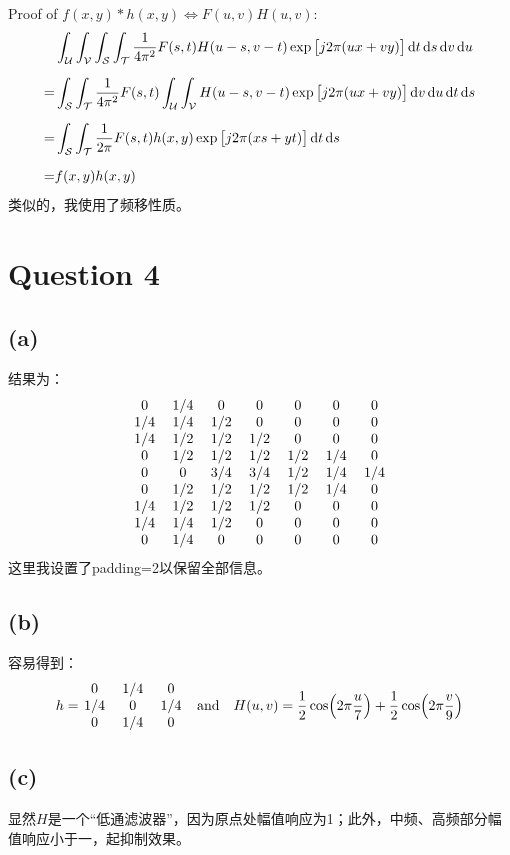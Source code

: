 \documentclass[fontset=macnew]{article}
\begin{document}
Proof of $f(x,y)*h(x,y)\iff F(u,v)H(u,v)$:
\[
	\begin{aligned}
		&\int_{\mathcal{U}}\int_{\mathcal{V}}\int_{\mathcal{S}}\int_{\mathcal{T}}
		\frac{1}{4\pi^2}
		F(s,t)H(u-s,v-t)\exp\big[j2\pi(ux+vy)\big]
		\dd{t}\dd{s}\dd{v}\dd{u}
		\\[6pt]=&
		\int_{\mathcal{S}}\int_{\mathcal{T}}
		\frac{1}{4\pi^2}
		F(s,t)
		\int_{\mathcal{U}}\int_{\mathcal{V}}
		H(u-s,v-t)\exp\big[j2\pi(ux+vy)\big]
		\dd{v}\dd{u}\dd{t}\dd{s}
		\\[6pt]=&
		\int_{\mathcal{S}}\int_{\mathcal{T}}
		\frac{1}{2\pi}
		F(s,t)h(x,y)\exp\big[j2\pi(xs+yt)\big]
		\dd{t}\dd{s}
		\\[6pt]=&
		f(x,y)h(x,y)
	\end{aligned}
\]类似的，我使用了频移性质。

\section*{Question 4}
\subsection*{(a)}
结果为：
\[
	\mqty{
	0 & \flatfrac{1}{4} & 0 & 0 & 0 & 0 & 0 \\
	\flatfrac{1}{4} & \flatfrac{1}{4} & \flatfrac{1}{2} & 0 & 0 & 0 & 0 \\
	\flatfrac{1}{4} & \flatfrac{1}{2} & \flatfrac{1}{2} & \flatfrac{1}{2} & 0 & 0 & 0 \\
	0 & \flatfrac{1}{2} & \flatfrac{1}{2} & \flatfrac{1}{2} & \flatfrac{1}{2} & \flatfrac{1}{4} & 0 \\
	0 & 0 & \flatfrac{3}{4} & \flatfrac{3}{4} & \flatfrac{1}{2} & \flatfrac{1}{4} & \flatfrac{1}{4}\\
	0 & \flatfrac{1}{2} & \flatfrac{1}{2} & \flatfrac{1}{2} & \flatfrac{1}{2} & \flatfrac{1}{4} & 0 \\
	\flatfrac{1}{4} & \flatfrac{1}{2} & \flatfrac{1}{2} & \flatfrac{1}{2} & 0 & 0 & 0 \\
	\flatfrac{1}{4} & \flatfrac{1}{4} & \flatfrac{1}{2} & 0 & 0 & 0 & 0 \\
	0 & \flatfrac{1}{4} & 0 & 0 & 0 & 0 & 0 \\
}
\] 
这里我设置了padding=2以保留全部信息。

\subsection*{(b)}
容易得到：
\[
	h=\mqty{
		0 & \flatfrac{1}{4} & 0 \\
		\flatfrac{1}{4} & 0 & \flatfrac{1}{4}\\
		0 & \flatfrac{1}{4} & 0 
	}
	\qand
	H(u,v)=\frac{1}{2}\cos(2\pi\frac{u}{7})+\frac{1}{2}\cos(2\pi\frac{v}{9})
\]
\subsection*{(c)}
显然$H$是一个“低通滤波器”，因为原点处幅值响应为1；此外，中频、高频部分幅值响应小于一，起抑制效果。
\end{document}
